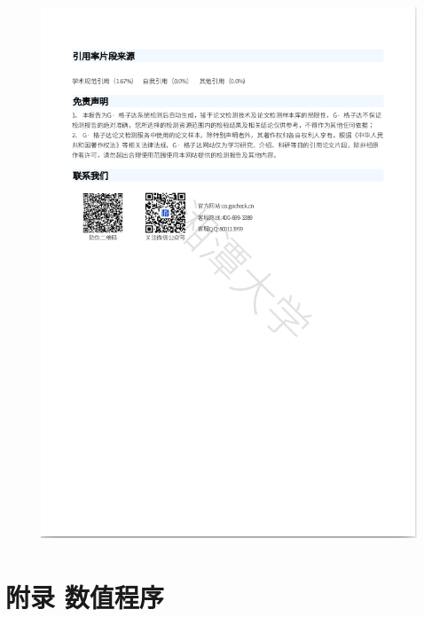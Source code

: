 \documentclass[a4paper,UTF8,titlepage,10pt]{ctexart}
\numberwithin{equation}{subsection}
\renewcommand\appendix{\par
	\setcounter{section}{0}
	\setcounter{subsection}{0}
	\gdef\thesection{附录 \Alph{section}}}
\begin{document}
\begin{figure}[h]
	\centering
	\includegraphics[height=16cm,width=13cm]{./push/2.png}
\end{figure}
\fi

\newpage
\appendix
\section{附录 数值程序}




\end{document}
